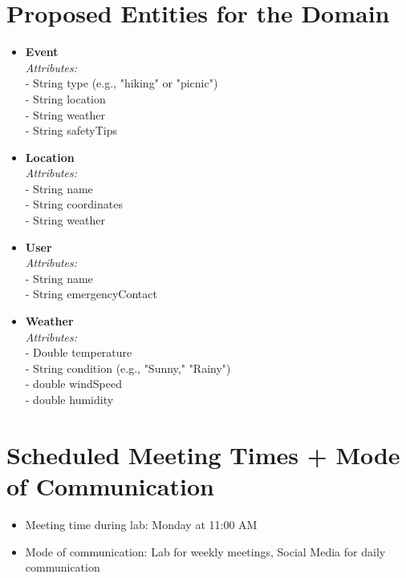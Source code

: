 \documentclass{article}
\begin{document}
\newpage

\section*{Proposed Entities for the Domain}
\begin{itemize}
    \item \textbf{Event} \\
    \textit{Attributes:} \\
    - String type (e.g., "hiking" or "picnic") \\
    - String location \\
    - String weather \\
    - String safetyTips
    \item \textbf{Location} \\
    \textit{Attributes:} \\
    - String name \\
    - String coordinates \\
    - String weather
    \item \textbf{User} \\
    \textit{Attributes:} \\
    - String name \\
    - String emergencyContact
    \item \textbf{Weather} \\
    \textit{Attributes:} \\
    - Double temperature \\
    - String condition (e.g., "Sunny," "Rainy") \\
    - double windSpeed \\
    - double humidity
\end{itemize}

\section*{Scheduled Meeting Times + Mode of Communication}
\begin{itemize}
    \item Meeting time during lab: Monday at 11:00 AM
    \item Mode of communication: Lab for weekly meetings, Social Media for daily communication
\end{itemize}
\end{document}
